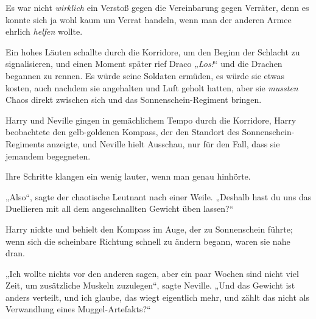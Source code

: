 Es war nicht \emph{wirklich} ein Verstoß gegen die Vereinbarung gegen Verräter, denn es konnte sich ja wohl kaum um Verrat handeln, wenn man der anderen Armee ehrlich \emph{helfen} wollte.

Ein hohes Läuten schallte durch die Korridore, um den Beginn der Schlacht zu signalisieren, und einen Moment später rief Draco
„\emph{Los!}“ und die Drachen begannen zu rennen. Es würde seine Soldaten ermüden, es würde sie etwas kosten, auch nachdem sie angehalten und Luft geholt hatten, aber sie \emph{mussten} Chaos direkt zwischen sich und das Sonnenschein-Regiment bringen.

\later

Harry und Neville gingen in gemächlichem Tempo durch die Korridore, Harry beobachtete den gelb-goldenen Kompass, der den Standort des Sonnenschein-Regiments anzeigte, und Neville hielt Ausschau, nur für den Fall, dass sie jemandem begegneten.

Ihre Schritte klangen ein wenig lauter, wenn man genau hinhörte.

„Also“, sagte der chaotische Leutnant nach einer Weile.
„Deshalb hast du uns das Duellieren mit all dem angeschnallten Gewicht üben lassen?“

Harry nickte und behielt den Kompass im Auge, der zu Sonnenschein führte; wenn sich die scheinbare Richtung schnell zu ändern begann, waren sie nahe dran.

„Ich wollte nichts vor den anderen sagen, aber ein paar Wochen sind nicht viel Zeit, um zusätzliche Muskeln zuzulegen“, sagte Neville.
„Und das Gewicht ist anders verteilt, und ich glaube, das wiegt eigentlich mehr, und zählt das nicht als Verwandlung eines Muggel-Artefakts?“

